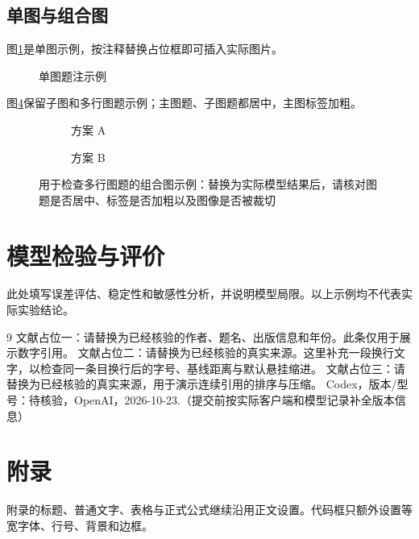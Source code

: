 \subsection{单图与组合图}
图\ref{fig:single}是单图示例，按注释替换占位框即可插入实际图片。
\begin{figure}[H]
  \centering
  \caption{单图题注示例}\label{fig:single}
\end{figure}
图\ref{fig:combined}保留子图和多行图题示例；主图题、子图题都居中，主图标签加粗。
\begin{figure}[H]
  \centering
  \begin{subfigure}[t]{0.46\linewidth}
    \centering
    \caption{方案 A}\label{fig:sub-a}
  \end{subfigure}\hfill
  \begin{subfigure}[t]{0.46\linewidth}
    \centering
    \caption{方案 B}\label{fig:sub-b}
  \end{subfigure}
  \caption{用于检查多行图题的组合图示例：替换为实际模型结果后，请核对图题是否居中、标签是否加粗以及图像是否被裁切}
  \label{fig:combined}
\end{figure}

\section{模型检验与评价}
此处填写误差评估、稳定性和敏感性分析，并说明模型局限。以上示例均不代表实际实验结论。

\clearpage
\begin{thebibliography}{9}
   文献占位一：请替换为已经核验的作者、题名、出版信息和年份。此条仅用于展示数字引用。
   文献占位二：请替换为已经核验的真实来源。这里补充一段换行文字，以检查同一条目换行后的字号、基线距离与默认悬挂缩进。
   文献占位三：请替换为已经核验的真实来源，用于演示连续引用的排序与压缩。
   Codex，版本/型号：待核验，OpenAI，2026-10-23.（提交前按实际客户端和模型记录补全版本信息）
\end{thebibliography}

\clearpage

\section{附录}
附录的标题、普通文字、表格与正式公式继续沿用正文设置。代码框只额外设置等宽字体、行号、背景和边框。
